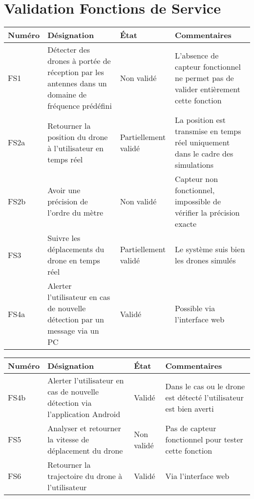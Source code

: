 \chapter{Validation Fonctions de Service}


\begin{tabular}{|p{}| |p{}  |m{}  |p{} |}	

     \hline
     Numéro & Désignation & État & Commentaires \\ \hline
     FS1 & Détecter des drones à portée de réception par les antennes dans un domaine de fréquence prédéfini & Non validé & L'absence de capteur fonctionnel ne permet pas de valider entièrement cette fonction \\ \hline
     FS2a & Retourner la position du drone à l'utilisateur en temps réel & Partiellement validé & La position est transmise en temps réel uniquement dans le cadre des simulations \\ \hline
     FS2b & Avoir une précision de l'ordre du mètre & Non validé & Capteur non fonctionnel, impossible de vérifier la précision exacte \\ \hline
     FS3 & Suivre les déplacements du drone en temps réel & Partiellement validé & Le système suis bien les drones simulés \\ \hline
     FS4a & Alerter l'utilisateur en cas de nouvelle détection par un message via un PC & Validé & Possible via l'interface web \\ \hline
     \hline
   \end{tabular}

\begin{tabular}{|p{}| |p{}  |m{}  |p{} |}	

	\hline
	Numéro & Désignation & État & Commentaires \\ \hline
   	FS4b & Alerter l'utilisateur en cas de nouvelle détection via l'application Android & Validé & Dans le cas ou le drone est détecté l'utilisateur est bien averti \\ \hline
   	FS5 & Analyser et retourner la vitesse de déplacement du drone & Non validé & Pas de capteur fonctionnel pour tester cette fonction \\ \hline
   	FS6 & Retourner la trajectoire du drone à l'utilisateur & Validé & Via l'interface web \\      
   	\hline
\end{tabular}
	
	


